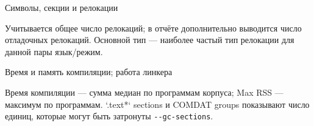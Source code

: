 \documentclass[aspectratio=169,11pt]{beamer}
\begin{document}
\begin{frame}{Символы, секции и релокации}
  \small
  \begin{center}
    \setlength{\tabcolsep}{4pt}
  \end{center}

  \smallskip
  \scriptsize
  Учитывается общее число релокаций; в отчёте дополнительно выводится
  число отладочных релокаций. Основной тип --- наиболее частый тип
  релокации для данной пары язык/режим.
\end{frame}

\begin{frame}{Время и память компиляции; работа линкера}
  \small
  \begin{center}
    \setlength{\tabcolsep}{4pt}
  \end{center}

  \smallskip
  \scriptsize
  Время компиляции --- сумма медиан по программам корпуса;
  Max RSS --- максимум по программам. `.text*` sections и COMDAT groups
  показывают число единиц, которые могут быть затронуты
  \texttt{-{}-gc-sections}.
\end{frame}
\end{document}
